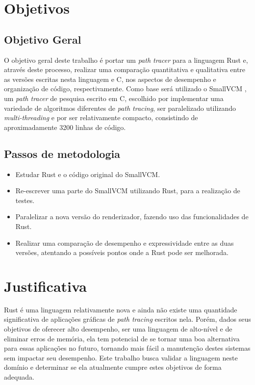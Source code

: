 \documentclass[tg]{mdtufsm}
\def\Cpp{{C\nolinebreak[4]\raisebox{.20ex}{\small\bf++}}}
\begin{document}
\section{Objetivos}

\subsection{Objetivo Geral}

O objetivo geral deste trabalho é portar um \emph{path tracer} para a linguagem Rust e, através deste processo,
realizar uma comparação quantitativa e qualitativa entre as versões escritas nesta linguagem e \Cpp, nos aspectos de
desempenho e organização de código, respectivamente. Como base será utilizado o SmallVCM \citep{smallvcm}, um
\emph{path tracer} de pesquisa escrito em \Cpp, escolhido por implementar uma variedade
de algoritmos diferentes de \emph{path tracing}, ser paralelizado utilizando \emph{multi-threading} e por ser relativamente compacto, consistindo de
aproximadamente 3200 linhas de código.

\subsection{Passos de metodologia}
\begin{itemize}
	\item Estudar Rust e o código original do SmallVCM.
	\item Re-escrever uma parte do SmallVCM utilizando Rust, para a realização de
		testes.
	\item Paralelizar a nova versão do renderizador, fazendo uso das funcionalidades de Rust.
	\item Realizar uma comparação de desempenho e expressividade entre as duas versões,
		atentando a possíveis pontos onde a Rust pode ser melhorada.
\end{itemize}

\section{Justificativa}

Rust é uma linguagem relativamente nova e ainda não existe uma quantidade significativa de aplicações gráficas de \emph{path tracing} escritos nela. Porém, dados seus objetivos de oferecer alto desempenho, ser uma linguagem de alto-nível e de eliminar erros de memória, ela tem potencial de se tornar uma boa alternativa para essas aplicações no futuro, tornando mais fácil a manutenção destes sistemas sem impactar seu desempenho. Este trabalho busca validar a linguagem neste domínio e determinar se ela atualmente cumpre estes objetivos de forma adequada.
\end{document}
